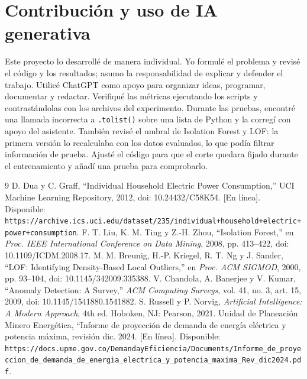 \documentclass[10pt,twocolumn]{article}
\newcommand{\url}[1]{\texttt{#1}}
\begin{document}
\section*{Contribución y uso de IA generativa}
Este proyecto lo desarrollé de manera individual. Yo formulé el problema y revisé el código y los resultados; asumo la responsabilidad de explicar y defender el trabajo. Utilicé ChatGPT como apoyo para organizar ideas, programar, documentar y redactar. Verifiqué las métricas ejecutando los scripts y contrastándolas con los archivos del experimento. Durante las pruebas, encontré una llamada incorrecta a \texttt{.tolist()} sobre una lista de Python y la corregí con apoyo del asistente. También revisé el umbral de Isolation Forest y LOF: la primera versión lo recalculaba con los datos evaluados, lo que podía filtrar información de prueba. Ajusté el código para que el corte quedara fijado durante el entrenamiento y añadí una prueba para comprobarlo.

\clearpage
\begin{thebibliography}{9}\small
{} D. Dua y C. Graff, ``Individual Household Electric Power Consumption,'' UCI Machine Learning Repository, 2012, doi: 10.24432/C58K54. [En línea]. Disponible: \url{https://archive.ics.uci.edu/dataset/235/individual+household+electric+power+consumption}.
 F. T. Liu, K. M. Ting y Z.-H. Zhou, ``Isolation Forest,'' en \emph{Proc. IEEE International Conference on Data Mining}, 2008, pp. 413–422, doi: 10.1109/ICDM.2008.17.
 M. M. Breunig, H.-P. Kriegel, R. T. Ng y J. Sander, ``LOF: Identifying Density-Based Local Outliers,'' en \emph{Proc. ACM SIGMOD}, 2000, pp. 93–104, doi: 10.1145/342009.335388.
 V. Chandola, A. Banerjee y V. Kumar, ``Anomaly Detection: A Survey,'' \emph{ACM Computing Surveys}, vol. 41, no. 3, art. 15, 2009, doi: 10.1145/1541880.1541882.
 S. Russell y P. Norvig, \emph{Artificial Intelligence: A Modern Approach}, 4th ed. Hoboken, NJ: Pearson, 2021.
 Unidad de Planeación Minero Energética, ``Informe de proyección de demanda de energía eléctrica y potencia máxima, revisión dic. 2024. [En línea]. Disponible: \url{https:/\allowbreak/\allowbreak docs.upme.gov.co/\allowbreak DemandayEficiencia/\allowbreak Documents/\allowbreak Informe\_\allowbreak de\_\allowbreak proyeccion\_\allowbreak de\_\allowbreak demanda\_\allowbreak de\_\allowbreak energia\_\allowbreak electrica\_\allowbreak y\_\allowbreak potencia\_\allowbreak maxima\_\allowbreak Rev\_\allowbreak dic2024.pdf}.
\end{thebibliography}
\end{document}
